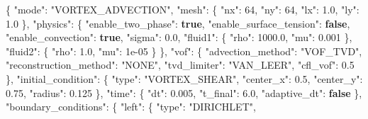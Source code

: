 \documentclass[
  10pt,
]{article}
\newenvironment{Shaded}{}{}
\newcommand{\DataTypeTok}[1]{\textcolor[rgb]{0.56,0.13,0.00}{#1}}
\newcommand{\DecValTok}[1]{\textcolor[rgb]{0.25,0.63,0.44}{#1}}
\newcommand{\FloatTok}[1]{\textcolor[rgb]{0.25,0.63,0.44}{#1}}
\newcommand{\FunctionTok}[1]{\textcolor[rgb]{0.02,0.16,0.49}{#1}}
\newcommand{\KeywordTok}[1]{\textcolor[rgb]{0.00,0.44,0.13}{\textbf{#1}}}
\newcommand{\StringTok}[1]{\textcolor[rgb]{0.25,0.44,0.63}{#1}}
\begin{document}
\begin{Shaded}
\begin{Highlighting}[]
\FunctionTok{\{}
  \DataTypeTok{"mode"}\FunctionTok{:} \StringTok{"VORTEX\_ADVECTION"}\FunctionTok{,}
  \DataTypeTok{"mesh"}\FunctionTok{:} \FunctionTok{\{}
    \DataTypeTok{"nx"}\FunctionTok{:} \DecValTok{64}\FunctionTok{,}
    \DataTypeTok{"ny"}\FunctionTok{:} \DecValTok{64}\FunctionTok{,}
    \DataTypeTok{"lx"}\FunctionTok{:} \FloatTok{1.0}\FunctionTok{,}
    \DataTypeTok{"ly"}\FunctionTok{:} \FloatTok{1.0}
  \FunctionTok{\},}
  \DataTypeTok{"physics"}\FunctionTok{:} \FunctionTok{\{}
    \DataTypeTok{"enable\_two\_phase"}\FunctionTok{:} \KeywordTok{true}\FunctionTok{,}
    \DataTypeTok{"enable\_surface\_tension"}\FunctionTok{:} \KeywordTok{false}\FunctionTok{,}
    \DataTypeTok{"enable\_convection"}\FunctionTok{:} \KeywordTok{true}\FunctionTok{,}
    \DataTypeTok{"sigma"}\FunctionTok{:} \FloatTok{0.0}\FunctionTok{,}
    \DataTypeTok{"fluid1"}\FunctionTok{:} \FunctionTok{\{}
      \DataTypeTok{"rho"}\FunctionTok{:} \FloatTok{1000.0}\FunctionTok{,}
      \DataTypeTok{"mu"}\FunctionTok{:} \FloatTok{0.001}
    \FunctionTok{\},}
    \DataTypeTok{"fluid2"}\FunctionTok{:} \FunctionTok{\{}
      \DataTypeTok{"rho"}\FunctionTok{:} \FloatTok{1.0}\FunctionTok{,}
      \DataTypeTok{"mu"}\FunctionTok{:} \DecValTok{1e{-}05}
    \FunctionTok{\}}
  \FunctionTok{\},}
  \DataTypeTok{"vof"}\FunctionTok{:} \FunctionTok{\{}
    \DataTypeTok{"advection\_method"}\FunctionTok{:} \StringTok{"VOF\_TVD"}\FunctionTok{,}
    \DataTypeTok{"reconstruction\_method"}\FunctionTok{:} \StringTok{"NONE"}\FunctionTok{,}
    \DataTypeTok{"tvd\_limiter"}\FunctionTok{:} \StringTok{"VAN\_LEER"}\FunctionTok{,}
    \DataTypeTok{"cfl\_vof"}\FunctionTok{:} \FloatTok{0.5}
  \FunctionTok{\},}
  \DataTypeTok{"initial\_condition"}\FunctionTok{:} \FunctionTok{\{}
    \DataTypeTok{"type"}\FunctionTok{:} \StringTok{"VORTEX\_SHEAR"}\FunctionTok{,}
    \DataTypeTok{"center\_x"}\FunctionTok{:} \FloatTok{0.5}\FunctionTok{,}
    \DataTypeTok{"center\_y"}\FunctionTok{:} \FloatTok{0.75}\FunctionTok{,}
    \DataTypeTok{"radius"}\FunctionTok{:} \FloatTok{0.125}
  \FunctionTok{\},}
  \DataTypeTok{"time"}\FunctionTok{:} \FunctionTok{\{}
    \DataTypeTok{"dt"}\FunctionTok{:} \FloatTok{0.005}\FunctionTok{,}
    \DataTypeTok{"t\_final"}\FunctionTok{:} \FloatTok{6.0}\FunctionTok{,}
    \DataTypeTok{"adaptive\_dt"}\FunctionTok{:} \KeywordTok{false}
  \FunctionTok{\},}
  \DataTypeTok{"boundary\_conditions"}\FunctionTok{:} \FunctionTok{\{}
    \DataTypeTok{"left"}\FunctionTok{:} \FunctionTok{\{}
      \DataTypeTok{"type"}\FunctionTok{:} \StringTok{"DIRICHLET"}\FunctionTok{,}

\end{Highlighting}
\end{Shaded}
\end{document}

